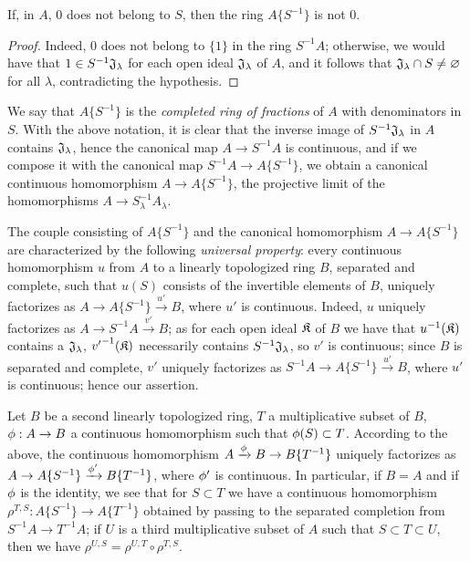 \begin{cor}[7.6.4]
\label{0.7.6.4}
If, in $A$, $0$ does not belong to $S$, then the ring $A\{S^{-1}\}$ is not $0$.
\end{cor}

\begin{proof}
\label{proof-0.7.6.4}
Indeed, $0$ does not belong to $\{1\}$ in the ring $S^{-1}A$; otherwise, we would have that
$1\in S^{-1}\mathfrak{J}_\lambda$ for each open ideal $\mathfrak{J}_\lambda$ of $A$, and it
follows that $\mathfrak{J}_\lambda\cap S\neq\varnothing$ for all $\lambda$, contradicting the
hypothesis.
\end{proof}

\begin{env}[7.6.5]
\label{0.7.6.5}
We say that $A\{S^{-1}\}$ is the \emph{completed ring of fractions} of $A$ with denominators
in $S$. With the above notation, it is clear that the inverse image of $S^{-1}\mathfrak{J}_\lambda$
in $A$ contains $\mathfrak{J}_\lambda$, hence the canonical map $A\to S^{-1}A$ is continuous, and if
we compose it with the canonical map $S^{-1}A\to A\{S^{-1}\}$, we obtain a canonical continuous
homomorphism $A\to A\{S^{-1}\}$, the projective limit of the homomorphisms
$A\to S_\lambda^{-1}A_\lambda$.
\end{env}

\begin{env}[7.6.6]
\label{0.7.6.6}
The couple consisting of $A\{S^{-1}\}$ and the canonical homomorphism $A\to A\{S^{-1}\}$ are
characterized by the following \emph{universal property}: every continuous homomorphism $u$ from
$A$ to a linearly topologized ring $B$, separated and complete, such that $u(S)$ consists of
the invertible elements of $B$, uniquely factorizes as $A\to A\{S^{-1}\}\xrightarrow{u'}B$, where
$u'$ is continuous. Indeed, $u$ uniquely factorizes as $A\to S^{-1}A\xrightarrow{v'}B$; as for
each open ideal $\mathfrak{K}$ of $B$ we have that $u^{-1}(\mathfrak{K})$ contains a
$\mathfrak{J}_\lambda$, ${v'}^{-1}(\mathfrak{K})$ necessarily contains $S^{-1}\mathfrak{J}_\lambda$,
so $v'$ is continuous; since $B$ is separated and complete, $v'$ uniquely factorizes as
$S^{-1}A\to A\{S^{-1}\}\xrightarrow{u'}B$, where $u'$ is continuous; hence our assertion.
\end{env}

\begin{env}[7.6.7]
\label{0.7.6.7}
Let $B$ be a second linearly topologized ring, $T$ a multiplicative subset of $B$,
$\vphi:A\to B$ a continuous homomorphism such that $\phi(S)\subset T$. According to the above,
the continuous homomorphism $A\xrightarrow{\vphi}B\to B\{T^{-1}\}$ uniquely factorizes as
$A\to A\{S^{-1}\}\xrightarrow{\vphi'}B\{T^{-1}\}$, where $\phi'$ is continuous. In particular,
if $B=A$ and if $\phi$ is the identity, we see that for $S\subset T$ we have a continuous
homomorphism $\rho^{T,S}:A\{S^{-1}\}\to A\{T^{-1}\}$ obtained by passing to the separated completion
from $S^{-1}A\to T^{-1}A$; if $U$ is a third multiplicative subset of $A$ such that
$S\subset T\subset U$, then we have $\rho^{U,S}=\rho^{U,T}\circ\rho^{T,S}$.
\end{env}

